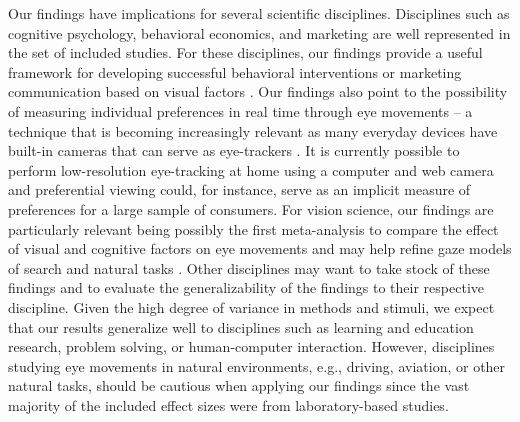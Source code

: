 Our findings have implications for several scientific disciplines. Disciplines such as cognitive psychology, behavioral economics, and marketing are well represented in the set of included studies. For these disciplines, our findings provide a useful framework for developing successful behavioral interventions or marketing communication based on visual factors \citep{muenscher2016a, orquinwedel2020}. Our findings also point to the possibility of measuring individual preferences in real time through eye movements -- a technique that is becoming increasingly relevant as many everyday devices have built-in cameras that can serve as eye-trackers \citep{bulling2019a}. It is currently possible to perform low-resolution eye-tracking at home using a computer and web camera and preferential viewing could, for instance, serve as an implicit measure of preferences for a large sample of consumers. For vision science, our findings are particularly relevant being possibly the first meta-analysis to compare the effect of visual and cognitive factors on eye movements and may help refine gaze models of search \citep{vanderlans2008} and natural tasks \citep{hayhoe2005}. Other disciplines may want to take stock of these findings and to evaluate the generalizability of the findings to their respective discipline. Given the high degree of variance in methods and stimuli, we expect that our results generalize well to disciplines such as learning and education research, problem solving, or human-computer interaction. However, disciplines studying eye movements in natural environments, e.g., driving, aviation, or other natural tasks, should be cautious when applying our findings since the vast majority of the included effect sizes were from laboratory-based studies.\\ 

